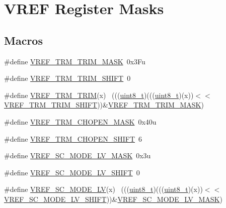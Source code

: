 \hypertarget{group___v_r_e_f___register___masks}{}\section{V\+R\+EF Register Masks}
\label{group___v_r_e_f___register___masks}
\subsection*{Macros}
\begin{DoxyCompactItemize}
\item 
\#define \hyperlink{group___v_r_e_f___register___masks_gaf233ddf56401003ec721b808d3910978}{V\+R\+E\+F\+\_\+\+T\+R\+M\+\_\+\+T\+R\+I\+M\+\_\+\+M\+A\+SK}~0x3\+Fu
\item 
\#define \hyperlink{group___v_r_e_f___register___masks_ga7738b4edb18c8c9dcb36d6be564c80e6}{V\+R\+E\+F\+\_\+\+T\+R\+M\+\_\+\+T\+R\+I\+M\+\_\+\+S\+H\+I\+FT}~0
\item 
\#define \hyperlink{group___v_r_e_f___register___masks_gac340a7abf4c9caf1594346d71a475a30}{V\+R\+E\+F\+\_\+\+T\+R\+M\+\_\+\+T\+R\+IM}(x)                                              ~(((\hyperlink{_p_e___types_8h_aba7bc1797add20fe3efdf37ced1182c5}{uint8\+\_\+t})(((\hyperlink{_p_e___types_8h_aba7bc1797add20fe3efdf37ced1182c5}{uint8\+\_\+t})(x))$<$$<$\hyperlink{group___v_r_e_f___register___masks_ga7738b4edb18c8c9dcb36d6be564c80e6}{V\+R\+E\+F\+\_\+\+T\+R\+M\+\_\+\+T\+R\+I\+M\+\_\+\+S\+H\+I\+FT}))\&\hyperlink{group___v_r_e_f___register___masks_gaf233ddf56401003ec721b808d3910978}{V\+R\+E\+F\+\_\+\+T\+R\+M\+\_\+\+T\+R\+I\+M\+\_\+\+M\+A\+SK})
\item 
\#define \hyperlink{group___v_r_e_f___register___masks_gaca90564d0247d6637d487fa045dbe328}{V\+R\+E\+F\+\_\+\+T\+R\+M\+\_\+\+C\+H\+O\+P\+E\+N\+\_\+\+M\+A\+SK}~0x40u
\item 
\#define \hyperlink{group___v_r_e_f___register___masks_gad66c35e7a2372a16a0ef1042ad0d029a}{V\+R\+E\+F\+\_\+\+T\+R\+M\+\_\+\+C\+H\+O\+P\+E\+N\+\_\+\+S\+H\+I\+FT}~6
\item 
\#define \hyperlink{group___v_r_e_f___register___masks_ga7eb8ab4b25ed9f93b23d7199c50e7181}{V\+R\+E\+F\+\_\+\+S\+C\+\_\+\+M\+O\+D\+E\+\_\+\+L\+V\+\_\+\+M\+A\+SK}~0x3u
\item 
\#define \hyperlink{group___v_r_e_f___register___masks_ga3130891ca865a042a784a2c3bc7141b0}{V\+R\+E\+F\+\_\+\+S\+C\+\_\+\+M\+O\+D\+E\+\_\+\+L\+V\+\_\+\+S\+H\+I\+FT}~0
\item 
\#define \hyperlink{group___v_r_e_f___register___masks_gada46f0a4d5c228d2193c8f292631265f}{V\+R\+E\+F\+\_\+\+S\+C\+\_\+\+M\+O\+D\+E\+\_\+\+LV}(x)                                          ~(((\hyperlink{_p_e___types_8h_aba7bc1797add20fe3efdf37ced1182c5}{uint8\+\_\+t})(((\hyperlink{_p_e___types_8h_aba7bc1797add20fe3efdf37ced1182c5}{uint8\+\_\+t})(x))$<$$<$\hyperlink{group___v_r_e_f___register___masks_ga3130891ca865a042a784a2c3bc7141b0}{V\+R\+E\+F\+\_\+\+S\+C\+\_\+\+M\+O\+D\+E\+\_\+\+L\+V\+\_\+\+S\+H\+I\+FT}))\&\hyperlink{group___v_r_e_f___register___masks_ga7eb8ab4b25ed9f93b23d7199c50e7181}{V\+R\+E\+F\+\_\+\+S\+C\+\_\+\+M\+O\+D\+E\+\_\+\+L\+V\+\_\+\+M\+A\+SK})

\end{DoxyCompactItemize}
